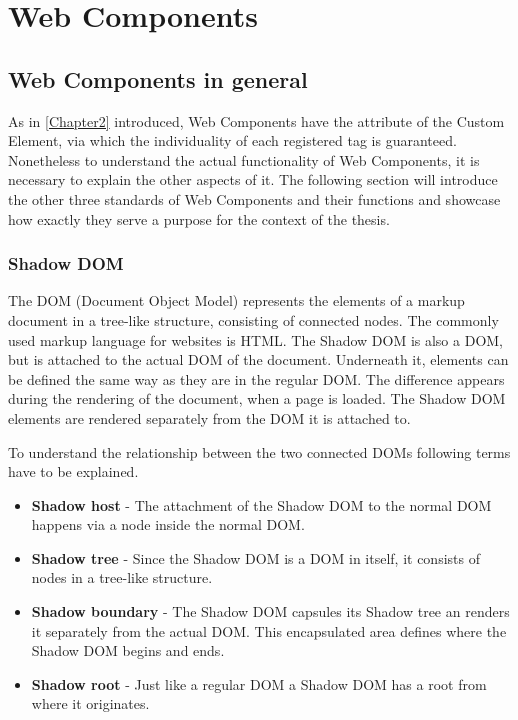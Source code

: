 \chapter{Web Components} %
\label{Chapter4}


\section{Web Components in general}

As in \ref{Chapter2} introduced, Web Components have the attribute of the Custom Element, via which the individuality of each registered tag is guaranteed.
Nonetheless to understand the actual functionality of Web Components, it is necessary to explain the other aspects of it.
The following section will introduce the other three standards of Web Components and their functions and showcase how exactly they serve a purpose for the context of the thesis.

\subsection{Shadow DOM}

The DOM (Document Object Model) represents the elements of a markup document in a tree-like structure, consisting of connected nodes. The commonly used markup language for websites is HTML. \cite{wc_shadow_dom}
The Shadow DOM is also a DOM, but is attached to the actual DOM of the document. Underneath it, elements can be defined the same way as they are in the regular DOM. The difference appears during the rendering of the document, when a page is loaded. The Shadow DOM elements are rendered separately from the DOM it is attached to.\cite{simon_thesis}

To understand the relationship between the two connected DOMs following terms have to be explained.

\begin{itemize}
	\item \textbf{Shadow host} - The attachment of the Shadow DOM to the normal DOM happens via a node inside the normal DOM.
	\item \textbf{Shadow tree} - Since the Shadow DOM is a DOM in itself, it consists of nodes in a tree-like structure.
	\item \textbf{Shadow boundary} - The Shadow DOM capsules its Shadow tree an renders it separately from the actual DOM. This encapsulated area defines where the Shadow DOM begins and ends.
	\item \textbf{Shadow root} - Just like a regular DOM a Shadow DOM has a root from where it originates.
\end{itemize} 


